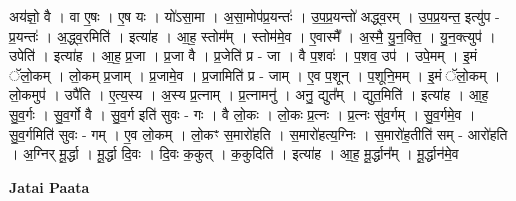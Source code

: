 \documentclass[17pt]{extarticle}
\begin{document}
अय॑ज्ञो॒ वै । वा ए॒षः । ए॒ष यः । यो॑ऽसा॒मा । अ॒सा॒मोप॑प्र॒यन्तः॑ । उ॒प॒प्र॒यन्तो॑ अद्ध्व॒रम् । उ॒प॒प्र॒यन्त॒ इत्यु॑प - प्र॒यन्तः॑ । अ॒द्ध्व॒रमिति॑ । इत्या॑ह । आ॒ह॒ स्तोम᳚म् । स्तोम॑मे॒व । ए॒वास्मै᳚ । अ॒स्मै॒ यु॒न॒क्ति॒ । यु॒न॒क्त्युप॑ । उपेति॑ । इत्या॑ह । आ॒ह॒ प्र॒जा । प्र॒जा वै । प्र॒जेति॑ प्र - जा । वै प॒शवः॑ । प॒शव॒ उप॑ । उपे॒मम् । इ॒मं ॅलो॒कम् । लो॒कम् प्र॒जाम् । प्र॒जामे॒व । प्र॒जामिति॑ प्र - जाम् । ए॒व प॒शून् । प॒शूनि॒मम् । इ॒मं ॅलो॒कम् । लो॒कमुप॑ । उपै॑ति । ए॒त्य॒स्य । अ॒स्य प्र॒त्नाम् । प्र॒त्नामनु॑ । अनु॒ द्युत᳚म् । द्युत॒मिति॑ । इत्या॑ह । आ॒ह॒ सु॒व॒र्गः । सु॒व॒र्गो वै । सु॒व॒र्ग इति॑ सुवः - गः । वै लो॒कः । लो॒कः प्र॒त्नः । प्र॒त्नः सु॑व॒र्गम् । सु॒व॒र्गमे॒व । सु॒व॒र्गमिति॑ सुवः - गम् । ए॒व लो॒कम् । लो॒कꣳ स॒मारो॑हति । स॒मारो॑हत्य॒ग्निः । स॒मारो॑ह॒तीति॑ सम् - आरो॑हति । अ॒ग्निर् मू॒र्द्धा । मू॒र्द्धा दि॒वः । दि॒वः क॒कुत् । क॒कुदिति॑ । इत्या॑ह । आ॒ह॒ मू॒र्द्धान᳚म् । मू॒र्द्धान॑मे॒व \newline

\textbf{Jatai Paata} \newline
\end{document}
